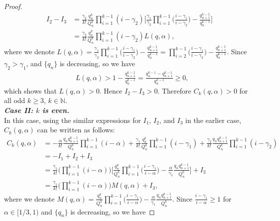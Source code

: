 \documentclass[12pt]{amsart}
\theoremstyle{definition}
\theoremstyle{plain}
\theoremstyle{definition}
\numberwithin{equation}{section}
\begin{document}
\begin{proof}
\begin{align*}
I_{2}-I_{3}&=\frac{\gamma_{2}}{k!}\frac{q_{n}^{k}}{Q_{n}^{k}}\displaystyle\prod_{i=1}^{k-1}(i-\gamma_{2})\Big[\frac{\gamma_{1}}{\gamma_{2}}\displaystyle\prod_{i=1}^{k-1}
\big(\frac{i-\gamma_{1}}{i-\gamma_{2}}\big)-\frac{q_{n+1}^{k-1}}{q_{n}^{k-1}}\Big]\\
&=\frac{\gamma_{2}}{k!}\frac{q_{n}^{k}}{Q_{n}^{k}}\displaystyle\prod_{i=1}^{k-1}(i-\gamma_{2})L(q,\alpha),
\end{align*}where we denote $L(q,\alpha)=\frac{\gamma_{1}}{\gamma_{2}}\displaystyle\prod_{i=1}^{k-1}
\big(\frac{i-\gamma_{1}}{i-\gamma_{2}}\big)-\frac{q_{n+1}^{k-1}}{q_{n}^{k-1}}=\displaystyle\prod_{i=2}^{k-1}
\big(\frac{i-\gamma_{1}}{i-\gamma_{2}}\big)-\frac{q_{n+1}^{k-1}}{q_{n}^{k-1}}$. Since $\gamma_2>\gamma_1$, and $\{q_n\}$ is decreasing, so we have
\begin{align*}
&L(q,\alpha)>1-\frac{q_{n+1}^{k-1}}{q_{n}^{k-1}}=\frac{q_{n}^{k-1}-q_{n+1}^{k-1}}{q_{n}^{k-1}}\geq 0,
\end{align*}
which shows that $L(q,\alpha)>0$. Hence $I_{2}-I_{3}>0$. Therefore $C_{k}(q,\alpha)>0$ for all odd $k\geq3$, $k\in\mathbb{N}$.\\
\emph{\textbf{Case II: $k$ is even.}}\\
In this case, using the similar expressions for $I_1$, $I_2$, and $I_3$ in the earlier case, $C_{k}(q,\alpha)$ can be written as follows:
\begin{align*}
C_{k}(q,\alpha)&=-\frac{\alpha}{k!}\frac{q_{n}q_{n+1}^{k-1}}{Q_{n}^{k}}\displaystyle\prod_{i=1}^{k-1}(i-\alpha)+
\frac{\gamma_{1}}{k!}\frac{q_{n}^{k}}{Q_{n}^{k}}\displaystyle\prod_{i=1}^{k-1}(i-\gamma_{1})+
\frac{\gamma_{2}}{k!}\frac{q_{n}q_{n+1}^{k-1}}{Q_{n}^{k}}\displaystyle\prod_{i=1}^{k-1}(i-\gamma_{2})\\
&=-I_{1}+I_{2}+I_{3}\\
&=\frac{\gamma_{1}}{k!}\Big(\displaystyle\prod_{i=1}^{k-1}(i-\alpha)\Big)\Big[\frac{q_{n}^{k}}{Q_{n}^{k}}\displaystyle\prod_{i=1}^{k-1}\big(\frac{i-\gamma_{1}}{i-\alpha}\big)-
\frac{\alpha}{\gamma_{1}}\frac{q_{n}q_{n+1}^{k-1}}{Q_{n}^{k}}\Big]+I_{3}\\
&=\frac{\gamma_{1}}{k!}\Big(\displaystyle\prod_{i=1}^{k-1}(i-\alpha)\Big)M(q,\alpha)+I_{3},
\end{align*}where we denote $M(q,\alpha)=\frac{q_{n}^{k}}{Q_{n}^{k}}\displaystyle\prod_{i=1}^{k-1}\big(\frac{i-\gamma_{1}}{i-\alpha}\big)-\frac{\alpha}{\gamma_{1}}\frac{q_{n}q_{n+1}^{k-1}}{Q_{n}^{k}}$. Since $\frac{i-\gamma_{1}}{i-\alpha}\geq1$ for $\alpha\in[1/3,1)$ and $\{q_{n}\}$ is decreasing, so we have

\end{proof}
\end{document}
